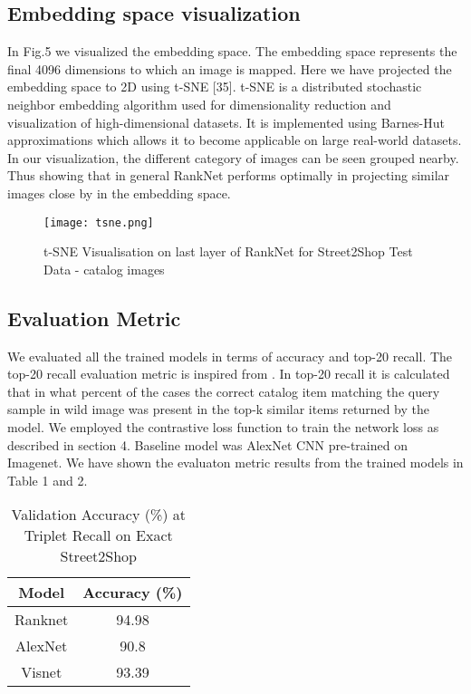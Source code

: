 \documentclass[10pt,twocolumn,letterpaper]{article}
\begin{document}
\subsection{Embedding space visualization}

In Fig.5 we visualized the embedding space. The embedding space represents the final 4096 dimensions to which an image is mapped. Here we have projected the embedding space to 2D using t-SNE [35]. t-SNE is a distributed stochastic neighbor embedding algorithm used for dimensionality reduction and visualization of high-dimensional datasets. It is implemented using Barnes-Hut approximations which allows it to become applicable on large real-world datasets. 
In our visualization, the different category of images can be seen grouped nearby. Thus showing that in general RankNet performs optimally in projecting similar images close by in the embedding space.

\begin{figure}[htp]
\centering
\texttt{[image: tsne.png]}
\caption{t-SNE Visualisation on last layer of RankNet for Street2Shop Test Data - catalog images}
\label{fig:captioning}
\end{figure}

\subsection{Evaluation Metric}

We evaluated all the trained models in terms of accuracy and top-20 recall. The top-20 recall evaluation metric is inspired from \cite{c20}. In top-20 recall it is calculated that in what percent of the cases the correct catalog item matching the query sample in wild image was present in the top-k similar items returned by the model. We employed the contrastive loss function to train the network loss as described in section 4. Baseline model was AlexNet CNN pre-trained on Imagenet. We have shown the evaluaton metric results from the trained models in Table 1 and 2.

\begin{table}[h]
\caption{Validation Accuracy (\%) at Triplet Recall on Exact Street2Shop}
\label{table_example}
\begin{center}
\begin{tabular}{|c||c|}
\hline
Model & Accuracy (\%)\\
\hline
\hline
Ranknet & 94.98\\
\hline
AlexNet & 90.8\\
\hline
Visnet & 93.39\\
\hline
\end{tabular}
\end{center}
\end{table}
\end{document}
